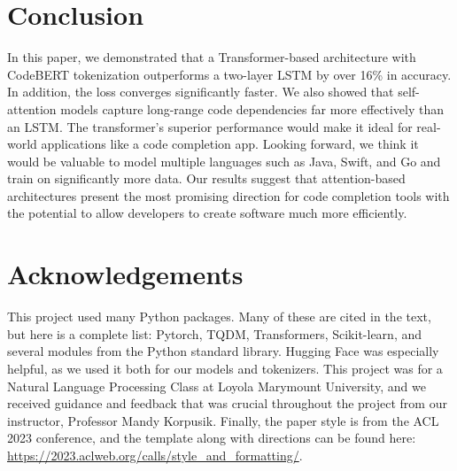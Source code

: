 \documentclass[11pt]{article}
\begin{document}

\section{Conclusion}
In this paper, we demonstrated that a Transformer-based architecture with CodeBERT tokenization outperforms a two-layer LSTM by over 16\% in accuracy. In addition, the loss converges significantly faster. We also showed that self-attention models capture long-range code dependencies far more effectively than an LSTM. The transformer's superior performance would make it ideal for real-world applications like a code completion app. Looking forward, we think it would be valuable to model multiple languages such as Java, Swift, and Go and train on significantly more data. Our results suggest that attention-based architectures present the most promising direction for code completion tools with the potential to allow developers to create software much more efficiently. 


\section{Acknowledgements}

This project used many Python packages. Many of these are cited in the text, but here is a complete list: Pytorch, TQDM, Transformers, Scikit-learn, and several modules from the Python standard library. Hugging Face was especially helpful, as we used it both for our models and tokenizers. This project was for a Natural Language Processing Class at Loyola Marymount University, and we received guidance and feedback that was crucial throughout the project from our instructor, Professor Mandy Korpusik. Finally, the paper style is from the ACL 2023 conference, and the template along with directions can be found here: \url{https://2023.aclweb.org/calls/style_and_formatting/}.


\nocite{*}


\end{document}
